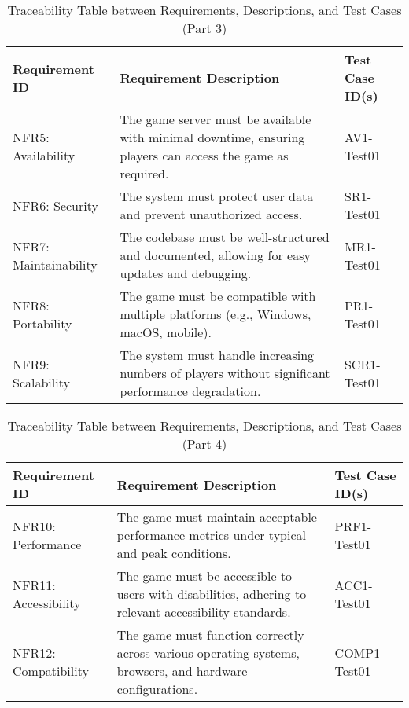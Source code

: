 \documentclass[12pt, titlepage]{article}
\begin{document}
\begin{table}[H]
\centering
\begin{tabularx}{\textwidth}{|l|X|X|}
\hline
\textbf{Requirement ID} & \textbf{Requirement Description} & \textbf{Test Case ID(s)} \\ \hline
NFR5: Availability & The game server must be available with minimal downtime, ensuring players can access the game as required. & AV1-Test01 \\ \hline
NFR6: Security & The system must protect user data and prevent unauthorized access. & SR1-Test01 \\ \hline
NFR7: Maintainability & The codebase must be well-structured and documented, allowing for easy updates and debugging. & MR1-Test01 \\ \hline
NFR8: Portability & The game must be compatible with multiple platforms (e.g., Windows, macOS, mobile). & PR1-Test01 \\ \hline
NFR9: Scalability & The system must handle increasing numbers of players without significant performance degradation. & SCR1-Test01 \\ \hline
\end{tabularx}
\caption{Traceability Table between Requirements, Descriptions, and Test Cases (Part 3)}
\end{table}

\begin{table}[H]
\centering
\begin{tabularx}{\textwidth}{|l|X|X|}
\hline
\textbf{Requirement ID} & \textbf{Requirement Description} & \textbf{Test Case ID(s)} \\ \hline
NFR10: Performance & The game must maintain acceptable performance metrics under typical and peak conditions. & PRF1-Test01 \\ \hline
NFR11: Accessibility & The game must be accessible to users with disabilities, adhering to relevant accessibility standards. & ACC1-Test01 \\ \hline
NFR12: Compatibility & The game must function correctly across various operating systems, browsers, and hardware configurations. & COMP1-Test01 \\ \hline
\end{tabularx}
\caption{Traceability Table between Requirements, Descriptions, and Test Cases (Part 4)}
\end{table}

\newpage
\end{document}
